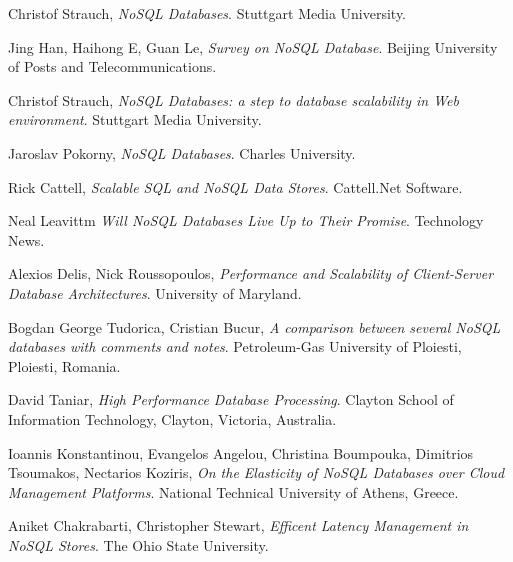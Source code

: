 \documentclass[times, 10pt,twocolumn]{article}
\newcounter{firstbib}
\begin{document}




\begin{thebibliography}{9}  

\setcounter{enumiv}{\value{firstbib}}

  	  Christof Strauch, 
      \emph{NoSQL Databases}. Stuttgart Media University.
      
  	  Jing Han, Haihong E, Guan Le,
      \emph{Survey on NoSQL Database}. Beijing University of Posts and Telecommunications.
      
  	  Christof Strauch, 
      \emph{NoSQL Databases: a step to database scalability in Web environment}. Stuttgart Media University.
      
  	   Jaroslav Pokorny, 
      \emph{NoSQL Databases}. Charles University.
      
  	  Rick Cattell, 
      \emph{Scalable SQL and NoSQL Data Stores}. Cattell.Net Software.
      
  	  Neal Leavittm 
      \emph{Will NoSQL Databases Live Up to Their Promise}. Technology News.
      
  	  Alexios Delis, Nick Roussopoulos, 
      \emph{Performance and Scalability of Client-Server Database Architectures}. University of Maryland.
      
  	  Bogdan George Tudorica, Cristian Bucur, 
      \emph{A comparison between several NoSQL databases with comments and notes}. Petroleum-Gas University of Ploiesti, Ploiesti, Romania.
      
  	  David Taniar, 
      \emph{High Performance Database Processing}. Clayton School of Information Technology, Clayton, Victoria, Australia.
      
  	  Ioannis Konstantinou, Evangelos Angelou, Christina Boumpouka, Dimitrios Tsoumakos, Nectarios Koziris, 
      \emph{On the Elasticity of NoSQL Databases over Cloud Management Platforms}. National Technical University of Athens, Greece.
      
  	  Aniket Chakrabarti, Christopher Stewart,
      \emph{Efficent Latency Management in NoSQL Stores}. The Ohio State University.
      

\end{thebibliography}
\end{document}
